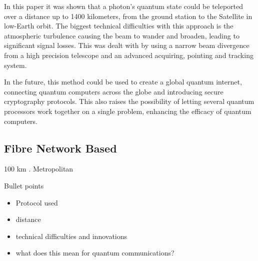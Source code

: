 In this paper it was shown that a photon's quantum state could be teleported over a distance up to 1400 kilometers, from the ground station to the Satellite in low-Earth orbit. The biggest technical 
difficulties with this approach is the atmospheric turbulence causing the beam to wander and broaden, leading to significant signal losses. This was dealt with by using a 
narrow beam divergence from a high precision telescope and an advanced acquiring, pointing and tracking system.

In the future, this method could be used to create a global quantum internet, connecting quantum computers across the globe and introducing secure cryptography protocols. 
This also raises the possibility of letting several quantum processors work together on a single problem, enhancing the efficacy of quantum computers.

\subsection{Fibre Network Based}
100 km \cite{Takesue:2015}. Metropolitan \cite{Valivarthi:2016}
\begin{mybox}{Bullet points}
    \begin{itemize}
        \item Protocol used
        \item distance
        \item technical difficulties and innovations
        \item what does this mean for quantum communications?
    \end{itemize}
\end{mybox} 

